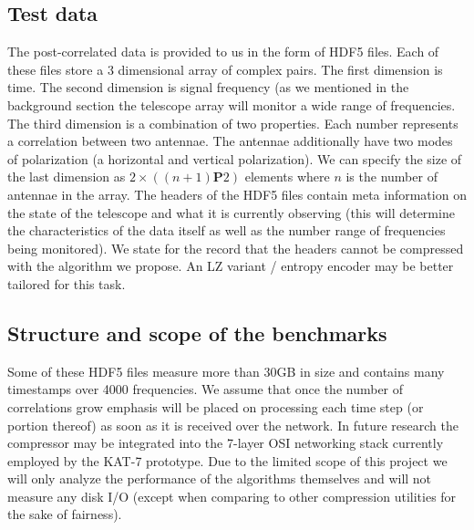 \documentclass{acm_proc_article-sp}
\begin{document}
\subsection{Test data}
The post-correlated data is provided to us in the form of HDF5 files. Each of these files store a 3 dimensional array of complex pairs. The first dimension is time. The second dimension is signal frequency (as we mentioned
in the background section the telescope array will monitor a wide range of frequencies. The third dimension is a combination of two properties. Each number represents a correlation between two antennae. The antennae additionally
have two modes of polarization (a horizontal and vertical polarization). We can specify the size of the last dimension as $2\times((n+1)\mathbf{P}2)$ elements where $n$ is the number of
antennae in the array. The headers of the HDF5 files contain meta information on the state of the telescope and what it is currently observing (this will determine the characteristics of the data itself as well as 
the number range of frequencies being monitored). We state for the record that the headers cannot be compressed with the algorithm we propose. An LZ variant / entropy encoder may be better tailored for this task.
\subsection{Structure and scope of the benchmarks}
Some of these HDF5 files measure more than 30GB in size and contains many timestamps over 4000 frequencies. We assume that once the number of correlations grow emphasis will be placed on processing each 
time step (or portion thereof) as soon as it is received over the network. In future research the compressor may be integrated into the 7-layer OSI networking stack currently employed by the KAT-7 prototype. Due to the limited
scope of this project we will only analyze the performance of the algorithms themselves and will not measure any disk I/O (except when comparing to other compression utilities for the sake of fairness).
\end{document}
